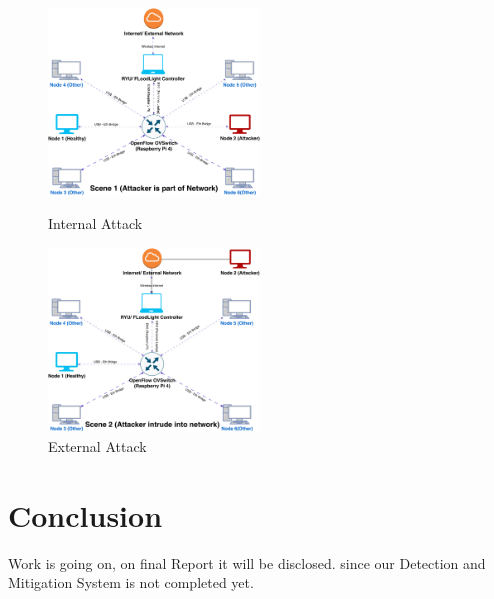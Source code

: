 \documentclass[12pt,twocolumn]{article}
\begin{document}
\begin{figure}[ht]
    \includegraphics[width=0.5\textwidth]{Scene1.pdf}
    \caption{Internal Attack}
    \label{fig:Scene1}
\vspace*{0.5 cm}
    \includegraphics[width=0.5\textwidth]{Scene2.pdf}
    \caption{External Attack}
    \label{fig:scene2}
\end{figure}

\section{Conclusion}
Work is going on, on final Report it will be disclosed.
since our Detection and Mitigation System is not completed yet.
\end{document}
